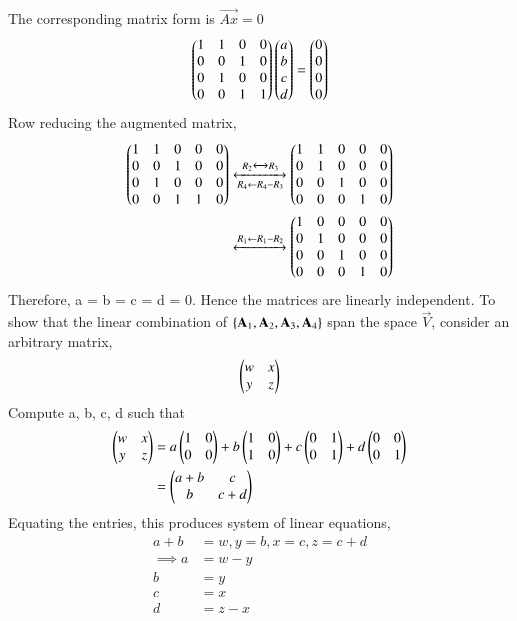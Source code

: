 The corresponding matrix form is $\vec{Ax} = 0$
\begin{align}
	\begin{pmatrix}1 & 1& 0 & 0\\ 0 & 0 & 1 & 0\\ 0 & 1 & 0 & 0\\0 & 0 & 1 & 1\end{pmatrix}\begin{pmatrix}a\\b\\c\\d\end{pmatrix} = \begin{pmatrix}0\\0\\0\\0\end{pmatrix}
\end{align}
Row reducing the augmented matrix,
\begin{align}
	\begin{pmatrix}1 & 1& 0 & 0& 0\\ 0 & 0 & 1 & 0& 0\\ 0 & 1 & 0 & 0 &0\\0 & 0 & 1 & 1 & 0\end{pmatrix}
	\xleftrightarrow[R_4 \leftarrow R_4 - R_3]{R_2 \xleftrightarrow{} R_3}
	\begin{pmatrix}1 & 1& 0 & 0& 0\\ 0 & 1 & 0 & 0& 0\\ 0 & 0 & 1 & 0 &0\\0 & 0 & 0 & 1 & 0\end{pmatrix}\\
	\xleftrightarrow{R_1 \leftarrow R_1 - R_2}
	\begin{pmatrix}1 & 0& 0 & 0& 0\\ 0 & 1 & 0 & 0& 0\\ 0 & 0 & 1 & 0 &0\\0 & 0 & 0 & 1 & 0\end{pmatrix}
\end{align}
Therefore, a = b = c = d = 0. Hence the matrices are linearly independent. To show that the linear combination of $\left\{\mathbf{A}_1, \mathbf{A}_2, \mathbf{A}_3, \mathbf{A}_4\right\} $ span the space $\vec{V}$, consider an arbitrary matrix,
\begin{align}
	\begin{pmatrix}w & x\\ y & z\end{pmatrix}
\end{align} 
Compute a, b, c, d such that
\begin{align}
	\begin{pmatrix}w & x\\ y & z\end{pmatrix} &= a\begin{pmatrix}1 & 0\\0 & 0\end{pmatrix} + b\begin{pmatrix}1 & 0\\1 & 0\end{pmatrix} + c\begin{pmatrix}0& 1\\0 & 1\end{pmatrix} + d\begin{pmatrix}0 & 0\\0 & 1\end{pmatrix} \label{eq:solutions/2/3/8/eq:eq1}\\
	&= \begin{pmatrix}a + b & c \\ b & c + d\end{pmatrix}
\end{align}
Equating the entries, this produces system of linear equations,
\begin{align}
	a + b &= w, y = b, x = c, z = c + d\\
	\implies a &= w - y\\
	 b &= y\\
	  c &= x\\
	  d &= z - x
\end{align}
